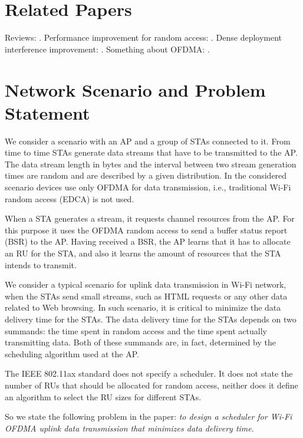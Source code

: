 \section{Related Papers}
Reviews: \cite{khorov2015ieee, bellalta2016ieee}.
Performance improvement for random access: \cite{khorov2016several}.
Dense deployment interference improvement: \cite{khorov2016joint}.
Something about OFDMA: \cite{qu2015ofdma}.

\section{Network Scenario and Problem Statement}
We consider a scenario with an AP and a group of STAs connected to it.
From time to time STAs generate data streams that have to be transmitted to the AP.
The data stream length in bytes and the interval between two stream generation times are random and are described by a given distribution.
In the considered scenario devices use only OFDMA for data transmission, i.e., traditional Wi-Fi random access (EDCA) is not used.

When a STA generates a stream, it requests channel resources from the AP.
For this purpose it uses the OFDMA random access to send a buffer status report (BSR) to the AP.
Having received a BSR, the AP learns that it has to allocate an RU for the STA, and also it learns the amount of resources that the STA intends to transmit.

We consider a typical scenario for uplink data transmission in Wi-Fi network, when the STAs send small streams, such as HTML requests or any other data related to Web browsing.
In such scenario, it is critical to minimize the data delivery time for the STAs.
The data delivery time for the STAs depends on two summands: the time spent in random access and the time spent actually transmitting data.
Both of these summands are, in fact, determined by the scheduling algorithm used at the AP.

The IEEE 802.11ax standard does not specify a scheduler.
It does not state the number of RUs that should be allocated for random access, neither does it define an algorithm to select the RU sizes for different STAs.

So we state the following problem in the paper: \emph{to design a scheduler for Wi-Fi OFDMA uplink data transmission that minimizes data delivery time}.

\clearpage

